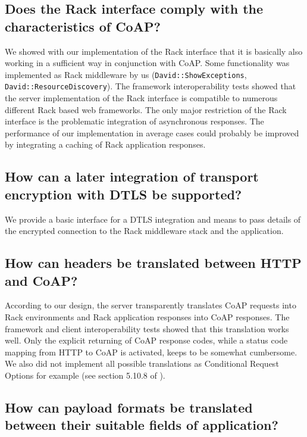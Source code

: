 	\subsection*{Does the Rack interface comply with the characteristics of
		\ac{CoAP}?}

		We showed with our implementation of the Rack interface that it is
		basically also working in a sufficient way in conjunction with
		\ac{CoAP}. Some functionality was implemented as Rack middleware by us
		(\texttt{David::ShowExceptions}, \texttt{David::ResourceDiscovery}).
		The framework interoperability tests showed that the server
		implementation of the Rack interface is compatible to numerous
		different Rack based web frameworks. The only major restriction of the
		Rack interface is the problematic integration of asynchronous
		responses. The performance of our implementation in average cases could
		probably be improved by integrating a caching of Rack application
		responses.

	\subsection*{How can a later integration of transport encryption with
		\ac{DTLS} \cite{dtls} be supported?}

		We provide a basic interface for a \ac{DTLS} integration and means to
		pass details of the encrypted connection to the Rack middleware stack
		and the application.

	\subsection*{How can headers be translated between \ac{HTTP} and \ac{CoAP}?}

		According to our design, the server transparently translates \ac{CoAP}
		requests into Rack environments and Rack application responses into
		\ac{CoAP} responses. The framework and client interoperability tests
		showed that this translation works well. Only the explicit returning of
		\ac{CoAP} response codes, while a status code mapping from \ac{HTTP} to
		\ac{CoAP} is activated, keeps to be somewhat cumbersome. We also did
		not implement all possible translations as Conditional Request Options
		for example (see section 5.10.8 of \cite{coap}).

	\subsection*{How can payload formats be translated between their suitable
		fields of application?}

